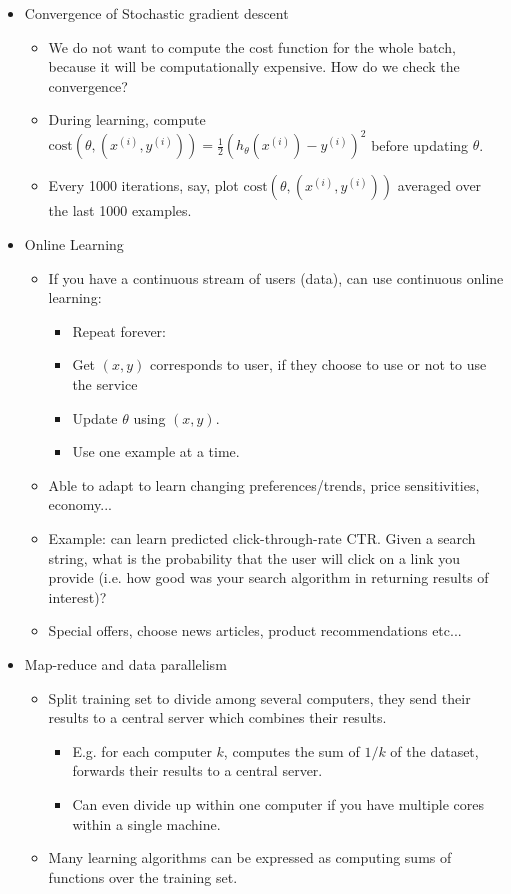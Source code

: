 \documentclass[letterpaper,10pt]{article}
\begin{document}
\begin{itemize}
\item Convergence of Stochastic gradient descent
	\begin{itemize}
	\item We do not want to compute the cost function for the whole batch, because it will be computationally expensive. How do we check the convergence?
	\item During learning, compute $\text{cost}(\theta, (x^{(i)}, y^{(i)}))=\frac{1}{2}\left( h_\theta(x^{(i)}) - y^{(i)} \right)^2$ before updating $\theta$.
	\item Every 1000 iterations, say, plot $\text{cost}(\theta, (x^{(i)}, y^{(i)}))$ averaged over the last 1000 examples.
	\end{itemize}

\item Online Learning
	\begin{itemize}
	\item If you have a continuous stream of users (data), can use continuous online learning:
		\begin{itemize}
		\item Repeat forever:
		\item Get $(x,y)$ corresponds to user, if they choose to use or not to use the service
		\item Update $\theta$ using $(x,y)$.
		\item Use one example at a time.
		\end{itemize}
	\item Able to adapt to learn changing preferences/trends, price sensitivities, economy...
	\item Example: can learn predicted click-through-rate CTR. Given a search string, what is the probability that the user will click on a link you provide (i.e. how good was your search algorithm in returning results of interest)?
	\item Special offers, choose news articles, product recommendations etc...
	\end{itemize}

\item Map-reduce and data parallelism
	\begin{itemize}
	\item Split training set to divide among several computers, they send their results to a central server which combines their results.
		\begin{itemize}
		\item E.g. for each computer $k$, computes the sum of $1/k$ of the dataset, forwards their results to a central server.
		\item Can even divide up within one computer if you have multiple cores within a single machine.
		\end{itemize}
	\item Many learning algorithms can be expressed as computing sums of functions over the training set.
	\end{itemize}

\end{itemize}
\end{document}
